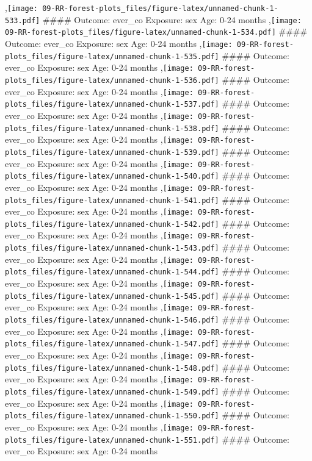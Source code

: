 \documentclass[
  9pt,
]{book}
\begin{document}
,\texttt{[image: 09-RR-forest-plots\_files/figure-latex/unnamed-chunk-1-533.pdf]}
\#\#\#\# Outcome: ever\_co Exposure: sex Age: 0-24 months
,\texttt{[image: 09-RR-forest-plots\_files/figure-latex/unnamed-chunk-1-534.pdf]}
\#\#\#\# Outcome: ever\_co Exposure: sex Age: 0-24 months
,\texttt{[image: 09-RR-forest-plots\_files/figure-latex/unnamed-chunk-1-535.pdf]}
\#\#\#\# Outcome: ever\_co Exposure: sex Age: 0-24 months
,\texttt{[image: 09-RR-forest-plots\_files/figure-latex/unnamed-chunk-1-536.pdf]}
\#\#\#\# Outcome: ever\_co Exposure: sex Age: 0-24 months
,\texttt{[image: 09-RR-forest-plots\_files/figure-latex/unnamed-chunk-1-537.pdf]}
\#\#\#\# Outcome: ever\_co Exposure: sex Age: 0-24 months
,\texttt{[image: 09-RR-forest-plots\_files/figure-latex/unnamed-chunk-1-538.pdf]}
\#\#\#\# Outcome: ever\_co Exposure: sex Age: 0-24 months
,\texttt{[image: 09-RR-forest-plots\_files/figure-latex/unnamed-chunk-1-539.pdf]}
\#\#\#\# Outcome: ever\_co Exposure: sex Age: 0-24 months
,\texttt{[image: 09-RR-forest-plots\_files/figure-latex/unnamed-chunk-1-540.pdf]}
\#\#\#\# Outcome: ever\_co Exposure: sex Age: 0-24 months
,\texttt{[image: 09-RR-forest-plots\_files/figure-latex/unnamed-chunk-1-541.pdf]}
\#\#\#\# Outcome: ever\_co Exposure: sex Age: 0-24 months
,\texttt{[image: 09-RR-forest-plots\_files/figure-latex/unnamed-chunk-1-542.pdf]}
\#\#\#\# Outcome: ever\_co Exposure: sex Age: 0-24 months
,\texttt{[image: 09-RR-forest-plots\_files/figure-latex/unnamed-chunk-1-543.pdf]}
\#\#\#\# Outcome: ever\_co Exposure: sex Age: 0-24 months
,\texttt{[image: 09-RR-forest-plots\_files/figure-latex/unnamed-chunk-1-544.pdf]}
\#\#\#\# Outcome: ever\_co Exposure: sex Age: 0-24 months
,\texttt{[image: 09-RR-forest-plots\_files/figure-latex/unnamed-chunk-1-545.pdf]}
\#\#\#\# Outcome: ever\_co Exposure: sex Age: 0-24 months
,\texttt{[image: 09-RR-forest-plots\_files/figure-latex/unnamed-chunk-1-546.pdf]}
\#\#\#\# Outcome: ever\_co Exposure: sex Age: 0-24 months
,\texttt{[image: 09-RR-forest-plots\_files/figure-latex/unnamed-chunk-1-547.pdf]}
\#\#\#\# Outcome: ever\_co Exposure: sex Age: 0-24 months
,\texttt{[image: 09-RR-forest-plots\_files/figure-latex/unnamed-chunk-1-548.pdf]}
\#\#\#\# Outcome: ever\_co Exposure: sex Age: 0-24 months
,\texttt{[image: 09-RR-forest-plots\_files/figure-latex/unnamed-chunk-1-549.pdf]}
\#\#\#\# Outcome: ever\_co Exposure: sex Age: 0-24 months
,\texttt{[image: 09-RR-forest-plots\_files/figure-latex/unnamed-chunk-1-550.pdf]}
\#\#\#\# Outcome: ever\_co Exposure: sex Age: 0-24 months
,\texttt{[image: 09-RR-forest-plots\_files/figure-latex/unnamed-chunk-1-551.pdf]}
\#\#\#\# Outcome: ever\_co Exposure: sex Age: 0-24 months
\end{document}
